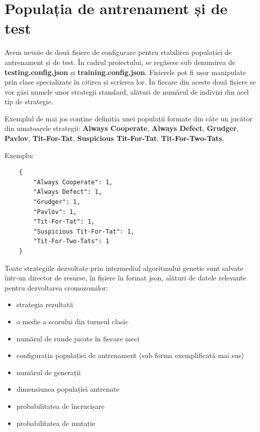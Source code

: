 \section{Populația de antrenament și de test}

Avem nevoie de două fișiere de configurare pentru stabilirea populației de antrenament și de test. În cadrul proiectului, se regăsesc sub denumirea de \textbf{testing.config.json} și \textbf{training.config.json}. Fișierele pot fi ușor manipulate prin clase specializate în citirea și scrierea lor. În fiecare din aceste două fișiere se vor găsi numele unor strategii standard, alături de numărul de indivizi din acel tip de strategie. 

Exemplul de mai jos conține definiția unei populații formate din câte un jucător din umatoarele strategii: \textbf{Always Cooperate}, \textbf{Always Defect}, \textbf{Grudger}, \textbf{Pavlov}, \textbf{Tit-For-Tat}, \textbf{Suspicious Tit-For-Tat}, \textbf{Tit-For-Two-Tats}.

Exemplu: 

\begin{lstlisting}
	{
		"Always Cooperate": 1,
		"Always Defect": 1,
		"Grudger": 1,
		"Pavlov": 1,
		"Tit-For-Tat": 1,
		"Suspicious Tit-For-Tat": 1,
		"Tit-For-Two-Tats": 1
	}
\end{lstlisting}

 
Toate strategiile dezvoltate prin intermediul algoritmului genetic sunt salvate într-un director de resurse, în fișiere în format json, alături de datele relevante pentru dezvoltarea cromozomilor: 
\begin{itemize}
	 \item[\textasteriskcentered] strategia rezultată 
  	 \item[\textasteriskcentered] o medie a scorului din turneul clasic 
  	 \item[\textasteriskcentered] numărul de runde jucate în fiecare meci 
  	 \item[\textasteriskcentered] configurația populației de antrenament (sub forma exemplificată mai sus)
  	 \item[\textasteriskcentered] numărul de generații 
  	 \item[\textasteriskcentered] dimensiunea populației antrenate
  	 \item[\textasteriskcentered] probabilitatea de încrucișare 
  	 \item[\textasteriskcentered] probabilitatea de mutație 
\end{itemize} 


